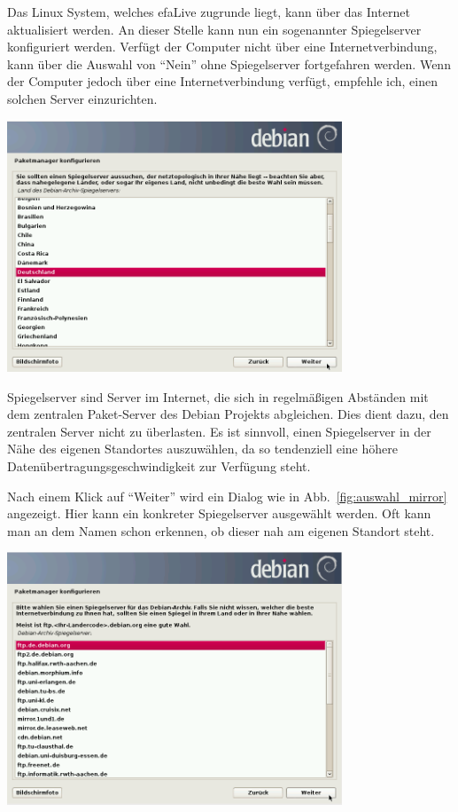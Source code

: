 \documentclass[a4paper,12pt,twoside]{article}
\begin{document}
Das Linux System, welches efaLive zugrunde liegt, kann über das Internet
aktualisiert werden. An dieser Stelle kann nun ein sogenannter
Spiegelserver konfiguriert werden. Verfügt der Computer nicht über eine
Internetverbindung, kann über die Auswahl von
"`Nein"' ohne Spiegelserver fortgefahren
werden. Wenn der Computer jedoch über eine Internetverbindung verfügt,
empfehle ich, einen solchen Server einzurichten.

\begin{minipage}{\linewidth}
    \centering
    \includegraphics[width=10cm]{efaLivede-img/efaLivede-img14.png}
    \label{fig:mirror_region}
\end{minipage}

Spiegelserver sind Server im Internet, die sich in regelmäßigen
Abständen mit dem zentralen Paket-Server des Debian Projekts
abgleichen. Dies dient dazu, den zentralen Server nicht zu überlasten.
Es ist sinnvoll, einen Spiegelserver in der Nähe des eigenen Standortes
auszuwählen, da so tendenziell eine höhere
Datenübertragungsgeschwindigkeit zur Verfügung steht.

Nach einem Klick auf "`Weiter"' wird
ein Dialog wie in Abb.~\ref{fig:auswahl_mirror} angezeigt. Hier kann ein
konkreter Spiegelserver ausgewählt werden. Oft kann man an dem Namen
schon erkennen, ob dieser nah am eigenen Standort steht.

\begin{minipage}{\linewidth}
    \centering
    \includegraphics[width=10cm]{efaLivede-img/efaLivede-img15.png}
    \label{fig:auswahl_mirror}
\end{minipage}
 
\end{document}
